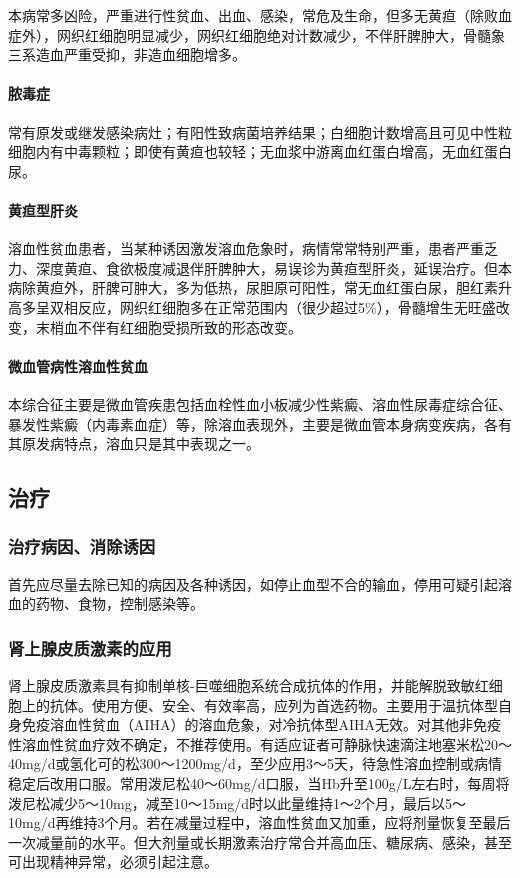 本病常多凶险，严重进行性贫血、出血、感染，常危及生命，但多无黄疸（除败血症外），网织红细胞明显减少，网织红细胞绝对计数减少，不伴肝脾肿大，骨髓象三系造血严重受抑，非造血细胞增多。

\paragraph{脓毒症}

常有原发或继发感染病灶；有阳性致病菌培养结果；白细胞计数增高且可见中性粒细胞内有中毒颗粒；即使有黄疸也较轻；无血浆中游离血红蛋白增高，无血红蛋白尿。

\paragraph{黄疸型肝炎}

溶血性贫血患者，当某种诱因激发溶血危象时，病情常常特别严重，患者严重乏力、深度黄疸、食欲极度减退伴肝脾肿大，易误诊为黄疸型肝炎，延误治疗。但本病除黄疸外，肝脾可肿大，多为低热，尿胆原可阳性，常无血红蛋白尿，胆红素升高多呈双相反应，网织红细胞多在正常范围内（很少超过5\%），骨髓增生无旺盛改变，末梢血不伴有红细胞受损所致的形态改变。

\paragraph{微血管病性溶血性贫血}

本综合征主要是微血管疾患包括血栓性血小板减少性紫癜、溶血性尿毒症综合征、暴发性紫癜（内毒素血症）等，除溶血表现外，主要是微血管本身病变疾病，各有其原发病特点，溶血只是其中表现之一。

\subsection{治疗}

\subsubsection{治疗病因、消除诱因}

首先应尽量去除已知的病因及各种诱因，如停止血型不合的输血，停用可疑引起溶血的药物、食物，控制感染等。

\subsubsection{肾上腺皮质激素的应用}

肾上腺皮质激素具有抑制单核-巨噬细胞系统合成抗体的作用，并能解脱致敏红细胞上的抗体。使用方便、安全、有效率高，应列为首选药物。主要用于温抗体型自身免疫溶血性贫血（AIHA）的溶血危象，对冷抗体型AIHA无效。对其他非免疫性溶血性贫血疗效不确定，不推荐使用。有适应证者可静脉快速滴注地塞米松20～40mg/d或氢化可的松300～1200mg/d，至少应用3～5天，待急性溶血控制或病情稳定后改用口服。常用泼尼松40～60mg/d口服，当Hb升至100g/L左右时，每周将泼尼松减少5～10mg，减至10～15mg/d时以此量维持1～2个月，最后以5～10mg/d再维持3个月。若在减量过程中，溶血性贫血又加重，应将剂量恢复至最后一次减量前的水平。但大剂量或长期激素治疗常合并高血压、糖尿病、感染，甚至可出现精神异常，必须引起注意。

